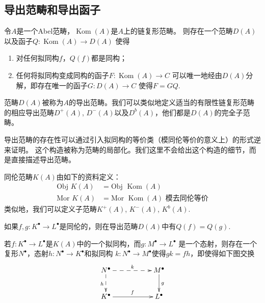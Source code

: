 \subsection{导出范畴和导出函子}

\begin{para}
    令$A$是一个Abel范畴，$\operatorname{Kom}(A)$是$A$上的链复形范畴。
    则存在一个范畴$D(A)$以及函子$Q:\operatorname{Kom}(A)\to D(A)$
	使得
	\begin{enumerate}
		\item 对任何拟同构$f$，$Q(f)$都是同构；
		\item 任何将拟同构变成同构的函子$F:\operatorname{Kom}(A)\to C$
            可以唯一地经由$D(A)$分解，即存在唯一的函子$G:D(A)\to C$
            使得$F=GQ$.
	\end{enumerate}
	范畴$D(A)$被称为$A$的导出范畴。我们可以类似地定义适当的有限性链复形范畴
    的相应导出范畴$D^+(A)$, $D^-(A)$以及$D^b(A)$，他们都是$D(A)$的完全子范畴。
\end{para}

导出范畴的存在性可以通过引入拟同构的等价类（模同伦等价的意义上）的形式逆来证明。
这个构造被称为范畴的局部化。我们这里不会给出这个构造的细节，而是直接描述导出范畴。

\begin{para}[同伦范畴]
	同伦范畴$K(A)$由如下的资料定义：
	\[
		\begin{aligned}
			\text{Obj $K(A)$} &= \text{Obj $\operatorname{Kom}(A)$}\\
			\text{Mor $K(A)$} &= \text{Mor $\operatorname{Kom}(A)$ 模去同伦等价}
		\end{aligned}
	\]
	类似地，我们可以定义子范畴$K^+(A)$, $K^-(A)$, $K^b(A)$.
\end{para}

\begin{lem}
    如果$f,g:K^\bullet\to L^\bullet$是同伦的，则在导出范畴$D(A)$中有$Q(f)=Q(g)$.
\end{lem}

\begin{lem}\label{lem:1.21}
	若$f:K^\bullet \to L^\bullet$是$K(A)$中的一个拟同构，而$g:M^\bullet \to L^\bullet$
    是一个态射，则存在一个复形$N^\bullet$，态射$h:N^\bullet\to K^\bullet$和拟同构
    $k:N^\bullet \to M^\bullet$使得$gk=fh$，即使得如下图交换
	\[
		\xymatrix{
		N^\bullet \ar@{-->}[rr]^{k} \ar@{-->}[d]_{h} &  & M^\bullet \ar@{->}[d]^{g} \\
		K^\bullet \ar@{->}[rr]^{f} &  & L^\bullet
		}
	\]
\end{lem}

